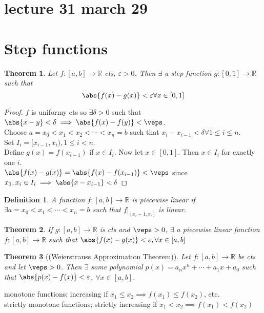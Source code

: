 \documentclass{report}
\newcommand{\bbR}{\mathbb{R}}  %
\theoremstyle{mystyle}
\newtheorem*{theorem}{Theorem}
\newtheorem*{definition}{Definition}
\theoremstyle{customtheorem}
\begin{document}
\section*{lecture 31 march 29}
\section*{Step functions}
\begin{theorem}
    Let $f:[a,b]\to\bbR$ cts, $\varepsilon>0$. Then $\exists$ a step function $g:[0,1]\to\bbR$ such that \[\abs{f(x)-g(x)}<\varepsilon \forall x\in[0,1]\]
\end{theorem}
\begin{proof}
    $f$ is uniformy cts so $\exists\delta>0$ such that $\abs{x-y}<\delta\implies\abs{f(x)-f(y)} <\veps$.\\
    Choose $a=x_0<x_1<x_2<\cdots<x_n=b$ such that $x_i-x_{i-1}<\delta\forall 1\leq i\leq n$. \\
    Set $I_i=[x_{i-1}, x_i), 1\leq i<n$. \\
    Define $g(x)=f(x_{i-1})$ if $x\in I_i$. Now let $x\in[0,1]$. Then $x\in I_i$ for exactly one $i$. \\
    $\abs{f(x)-g(x)}=\abs{f(x)-f(x_{i-1})} <\veps$ since $x_1, x_i\in I_i\implies\abs{x-x_{i-1}}<\delta$
\end{proof}

\begin{definition}
    A function $f:[a,b]\to\bbR$ is piecewise linear if $\exists a=x_0<x_1<\cdots<x_n=b$ such that $f\vert_{[x_i-1,x_i]}$ is linear.
\end{definition}

\begin{theorem}
    If $g:[a,b]\to\bbR$ is cts and $\veps>0$, $\exists$ a piecewise linear function $f:[a,b]\to\bbR$ such that $\abs{f(x)-g(x)}<\varepsilon, \forall x\in[a,b]$
\end{theorem}

\begin{theorem}[(Weierstrauss Approximation Theorem)]
    Let $f:[a,b]\to\bbR$ be cts and let $\veps>0$. Then $\exists$ some polynomial $p(x)=a_nx^n+\cdots+a_1x+a_0$ such that $\abs{p(x)-f(x)}<\varepsilon$, $\forall x\in[a,b]$.
\end{theorem}

monotone functions; increasing if $x_1\leq x_2 \implies f(x_1)\leq f(x_2)$, etc.\\
strictly monotone functions; strictly increasing if $x_1< x_2 \implies f(x_1)< f(x_2)$
\end{document}
